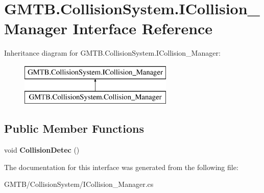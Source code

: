 \hypertarget{interface_g_m_t_b_1_1_collision_system_1_1_i_collision___manager}{}\section{G\+M\+T\+B.\+Collision\+System.\+I\+Collision\+\_\+\+Manager Interface Reference}
\label{interface_g_m_t_b_1_1_collision_system_1_1_i_collision___manager}
Inheritance diagram for G\+M\+T\+B.\+Collision\+System.\+I\+Collision\+\_\+\+Manager\+:\begin{figure}[H]
\begin{center}
\leavevmode
\includegraphics[height=2.000000cm]{interface_g_m_t_b_1_1_collision_system_1_1_i_collision___manager}
\end{center}
\end{figure}
\subsection*{Public Member Functions}
\begin{DoxyCompactItemize}
\item 
\mbox{\label{interface_g_m_t_b_1_1_collision_system_1_1_i_collision___manager_a021c9b4603086879e76b1a98cb239171}} 
void {\bfseries Collision\+Detec} ()
\end{DoxyCompactItemize}


The documentation for this interface was generated from the following file\+:\begin{DoxyCompactItemize}
\item 
G\+M\+T\+B/\+Collision\+System/I\+Collision\+\_\+\+Manager.\+cs\end{DoxyCompactItemize}
